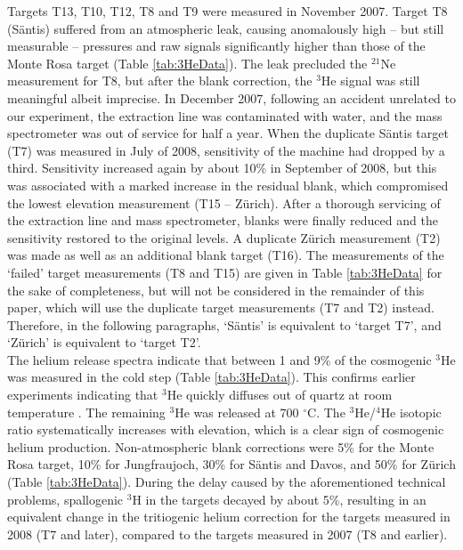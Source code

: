 \documentclass{article}
\begin{document}
Targets  T13, T10,  T12, T8  and T9  were measured  in  November 2007.
Target  T8 (S\"{a}ntis)  suffered  from an  atmospheric leak,  causing
anomalously high -- but still  measurable -- pressures and raw signals
significantly  higher  than those  of  the  Monte  Rosa target  (Table
\ref{tab:3HeData}).  The leak  precluded the $^{21}$Ne measurement for
T8,  but after  the  blank  correction, the  $^3$He  signal was  still
meaningful albeit  imprecise. In December 2007,  following an accident
unrelated to our experiment, the extraction line was contaminated with
water,  and  the mass  spectrometer  was out  of  service  for half  a
year. When the  duplicate S\"{a}ntis target (T7) was  measured in July
of  2008,  sensitivity  of  the   machine  had  dropped  by  a  third.
Sensitivity increased  again by about  10\% in September of  2008, but
this  was associated  with a  marked increase  in the  residual blank,
which   compromised   the  lowest   elevation   measurement  (T15   --
Z\"{u}rich).  After  a thorough servicing  of the extraction  line and
mass  spectrometer, blanks  were finally  reduced and  the sensitivity
restored to  the original levels.  A  duplicate Z\"{u}rich measurement
(T2)  was made  as  well as  an  additional blank  target (T16).   The
measurements  of the  `failed' target  measurements (T8  and  T15) are
given  in Table \ref{tab:3HeData}  for the  sake of  completeness, but
will not be considered in the  remainder of this paper, which will use
the duplicate target measurements  (T7 and T2) instead.  Therefore, in
the following  paragraphs, `S\"{a}ntis' is equivalent  to `target T7',
and `Z\"{u}rich' is equivalent to `target T2'.  \\

The  helium release spectra  indicate that  between 1  and 9\%  of the
cosmogenic   $^3$He   was   measured   in   the   cold   step   (Table
\ref{tab:3HeData}).  This confirms earlier experiments indicating that
$^3$He   quickly  diffuses   out   of  quartz   at  room   temperature
\citep{shuster2005}.  The  remaining $^3$He was  released at 700
$^{\circ}$C.    The   $^3$He/$^4$He   isotopic  ratio   systematically
increases with elevation,  which is a clear sign  of cosmogenic helium
production.  Non-atmospheric blank corrections  were 5\% for the Monte
Rosa target, 10\% for Jungfraujoch, 30\% for S\"{a}ntis and Davos, and
50\%  for  Z\"{u}rich  (Table  \ref{tab:3HeData}).  During  the  delay
caused by the aforementioned  technical problems, spallogenic $^3$H in
the targets decayed by about 5\%, resulting in an equivalent change in
the tritiogenic helium correction for the targets measured in 2008 (T7
and later), compared to the targets measured in 2007 (T8 and earlier).
\\
\end{document}
